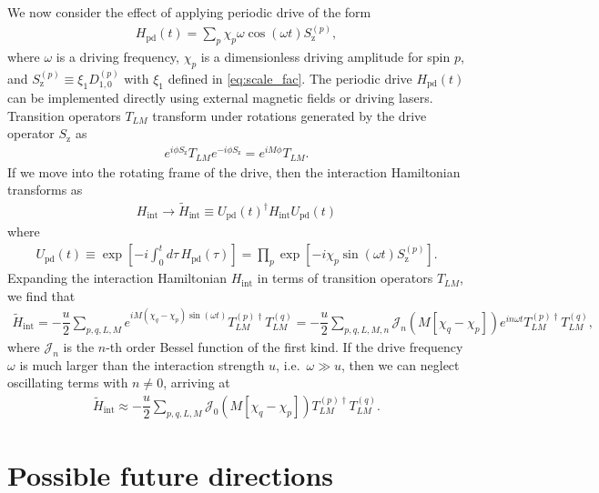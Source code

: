 \documentclass[nofootinbib,notitlepage,11pt]{revtex4-2}
\renewcommand{\t}{\text} %
\newcommand{\f}[2]{\dfrac{#1}{#2}} %
\newcommand{\p}[1]{\left(#1\right)} %
\renewcommand{\sp}[1]{\left[#1\right]} %
\newcommand{\1}{\mathds{1}}
\newcommand{\z}{\text{z}}
\newcommand{\J}{\mathcal{J}}
\begin{document}
We now consider the effect of applying periodic drive of the form
\begin{align}
  H_{\t{pd}}\p{t} = \sum_p \chi_p \omega \cos\p{\omega t} S_\z^{(p)},
\end{align}
where $\omega$ is a driving frequency, $\chi_p$ is a dimensionless
driving amplitude for spin $p$, and
$S_\z^{(p)} \equiv \xi_1 D_{1,0}^{(p)}$ with $\xi_1$ defined in
\eqref{eq:scale_fac}.  The periodic drive $H_{\t{pd}}\p{t}$ can be
implemented directly using external magnetic fields or driving lasers.
Transition operators $T_{LM}$ transform under rotations generated by
the drive operator $S_\z$ as
\begin{align}
  e^{i\phi S_\z} T_{LM} e^{-i\phi S_\z} = e^{iM\phi} T_{LM}.
\end{align}
If we move into the rotating frame of the drive, then the interaction
Hamiltonian transforms as
\begin{align}
  H_{\t{int}} \to \tilde H_{\t{int}}
  \equiv U_{\t{pd}}\p{t}^\dag H_{\t{int}} U_{\t{pd}}\p{t}
\end{align}
where
\begin{align}
  U_{\t{pd}}\p{t} \equiv \exp\sp{-i\int_0^td\tau\,H_{\t{pd}}\p{\tau}}
  = \prod_p \exp\sp{-i \chi_p \sin\p{\omega t} S_\z^{(p)}}.
\end{align}
Expanding the interaction Hamiltonian $H_{\t{int}}$ in terms of
transition operators $T_{LM}$, we find that
\begin{align}
  \tilde H_{\t{int}}
  = -\f{u}{2} \sum_{p,q,L,M} e^{iM\p{\chi_q-\chi_p}\sin\p{\omega t}}
  T_{LM}^{(p)\dag} T_{LM}^{(q)}
  = -\f{u}{2} \sum_{p,q,L,M,n}
  \J_n\p{M\sp{\chi_q-\chi_p}} e^{in\omega t}
  T_{LM}^{(p)\dag} T_{LM}^{(q)},
\end{align}
where $\J_n$ is the $n$-th order Bessel function of the first kind.
If the drive frequency $\omega$ is much larger than the interaction
strength $u$, i.e.~$\omega\gg u$, then we can neglect oscillating
terms with $n\ne0$, arriving at
\begin{align}
  \tilde H_{\t{int}} \approx -\f{u}{2} \sum_{p,q,L,M}
  \J_0\p{M\sp{\chi_q-\chi_p}}
  T_{LM}^{(p)\dag} T_{LM}^{(q)}.
\end{align}

\section{Possible future directions}
\end{document}
